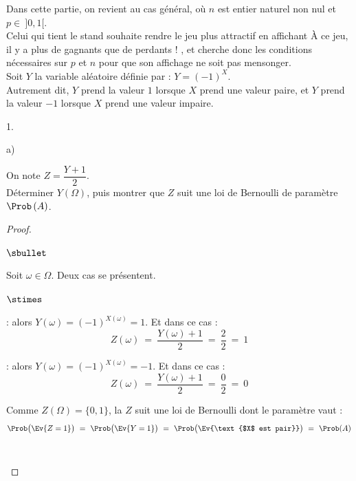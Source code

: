 \documentclass[11pt]{article}%
\begin{document}
\noindent
Dans cette partie, on revient au cas général, où $n$ est entier
naturel non nul et $p \in \ ]0,1[$.\\
Celui qui tient le stand souhaite rendre le jeu plus attractif en
affichant \og À ce jeu, il y a plus de gagnants que de perdants ! \fg,
et cherche donc les conditions nécessaires sur $p$ et $n$ pour que son
affichage ne soit pas mensonger.\\
Soit $Y$ la variable aléatoire définie par : $Y = (-1)^{X}$.\\
Autrement dit, $Y$ prend la valeur $1$ lorsque $X$ prend une valeur
paire, et $Y$ prend la valeur $-1$ lorsque $X$ prend une valeur
impaire.
\begin{noliste}{1.}
  \setlength{\itemsep}{4mm}
\item
  \begin{noliste}{a)} 
    \setlength{\itemsep}{2mm}
  \item On note $Z = \dfrac{Y + 1}{2}$.\\[.2cm]
    Déterminer $Y(\Omega)$, puis montrer que $Z$ suit une loi de
    Bernoulli de paramètre $\Prob\left( A \right)$.

    \begin{proof}~%
      \begin{noliste}{$\sbullet$}
      \item Soit $\omega \in \Omega$. Deux cas se présentent.
        \begin{noliste}{$\stimes$}
        \item {} : alors $Y(\omega) =
          (-1)^{X(\omega)} = 1$. Et dans ce cas :
          \[
          Z(\omega) \ = \ \dfrac{Y(\omega) + 1}{2} \ = \ \dfrac{2}{2}
          \ = \ 1
          \]
        \item {} : alors $Y(\omega)
          = (-1)^{X(\omega)} = -1$.  Et dans ce cas :
          \[
          Z(\omega) \ = \ \dfrac{Y(\omega) + 1}{2} \ = \ \dfrac{0}{2}
          \ = \ 0
          \]
        \end{noliste}

      \item Comme $Z(\Omega) = \{0, 1\}$, la \var $Z$ suit une loi de
        Bernoulli dont le paramètre vaut :
        \[
        \Prob\big( \Ev{Z = 1} \big) \ = \ \Prob\big( \Ev{Y = 1} \big)
        \ = \ \Prob\big( \Ev{\text{$X$ est pair}} \big) \ = \ \Prob(A)
        \]
        ~\\[-1.2cm]
      \end{noliste}
    \end{proof}


\end{noliste}
\end{noliste}
\end{document}
